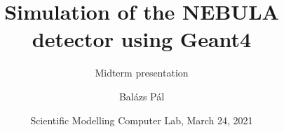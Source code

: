 \title[Geant4]
{Simulation of the NEBULA detector using Geant4}

\subtitle{Midterm presentation}

\author[Balázs Pál]
{Balázs Pál}


\date[ELTE 2021]
{Scientific Modelling Computer Lab, March 24, 2021}

